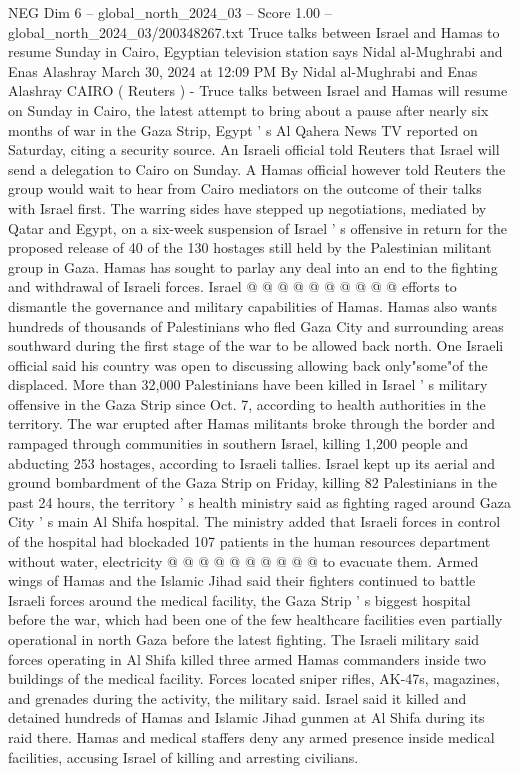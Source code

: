 \begin{textsample}{NEG Dim 6 – global\_north\_2024\_03 – Score 1.00 – global\_north\_2024\_03/200348267.txt}  \label{ex:f6_neg_397}
Truce talks between Israel and Hamas to resume Sunday in Cairo, Egyptian television station says Nidal al-Mughrabi and Enas Alashray March 30, 2024 at 12:09 PM By Nidal al-Mughrabi and Enas Alashray CAIRO ( Reuters ) - Truce talks between Israel and Hamas will resume on Sunday in Cairo, the latest attempt to bring about a pause after nearly six months of war in the Gaza Strip, Egypt ' s Al Qahera News TV reported on Saturday, citing a security source.
An Israeli official told Reuters that Israel will send a delegation to Cairo on Sunday.
A Hamas official however told Reuters the group would wait to hear from Cairo mediators on the outcome of their talks with Israel first.
The warring sides have stepped up negotiations, mediated by Qatar and Egypt, on a six-week suspension of Israel ' s offensive in return for the proposed release of 40 of the 130 hostages still held by the Palestinian militant group in Gaza.
Hamas has sought to parlay any deal into an end to the fighting and withdrawal of Israeli forces.
Israel @ @ @ @ @ @ @ @ @ @ efforts to dismantle the governance and military capabilities of Hamas.
Hamas also wants hundreds of thousands of Palestinians who fled Gaza City and surrounding areas southward during the first stage of the war to be allowed back north.
One Israeli official said his country was open to discussing allowing back only"some"of the displaced.
More than 32,000 Palestinians have been killed in Israel ' s military offensive in the Gaza Strip since Oct. 7, according to health authorities in the territory.
The war erupted after Hamas militants broke through the border and rampaged through communities in southern Israel, killing 1,200 people and abducting 253 hostages, according to Israeli tallies.
Israel kept up its aerial and ground bombardment of the Gaza Strip on Friday, killing 82 Palestinians in the past 24 hours, the territory ' s health ministry said as fighting raged around Gaza City ' s main Al Shifa hospital.
The ministry added that Israeli forces in control of the hospital had blockaded 107 patients in the human resources department without water, electricity @ @ @ @ @ @ @ @ @ @ to evacuate them.
Armed wings of Hamas and the Islamic Jihad said their fighters continued to battle Israeli forces around the medical facility, the Gaza Strip ' s biggest hospital before the war, which had been one of the few healthcare facilities even partially operational in north Gaza before the latest fighting.
The Israeli military said forces operating in Al Shifa killed three armed Hamas commanders inside two buildings of the medical facility.
Forces located sniper rifles, AK-47s, magazines, and grenades during the activity, the military said.
Israel said it killed and detained hundreds of Hamas and Islamic Jihad gunmen at Al Shifa during its raid there.
Hamas and medical staffers deny any armed presence inside medical facilities, accusing Israel of killing and arresting civilians.

\end{textsample}
